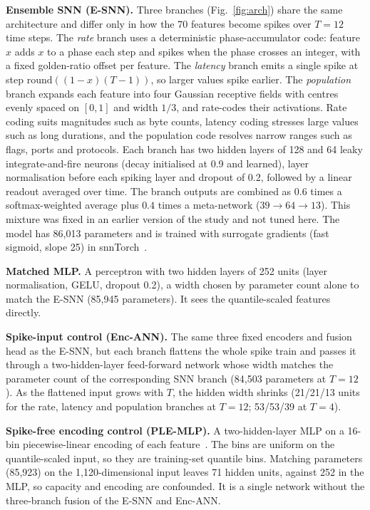 \documentclass[conference]{IEEEtran}
\begin{document}
\textbf{Ensemble SNN (E-SNN).} Three branches (Fig.~\ref{fig:arch}) share the same architecture and differ only in how the 70 features become spikes over $T = 12$ time steps. The \emph{rate} branch uses a deterministic phase-accumulator code: feature $x$ adds $x$ to a phase each step and spikes when the phase crosses an integer, with a fixed golden-ratio offset per feature. The \emph{latency} branch emits a single spike at step $\mathrm{round}((1-x)(T-1))$, so larger values spike earlier. The \emph{population} branch expands each feature into four Gaussian receptive fields with centres evenly spaced on $[0,1]$ and width $1/3$, and rate-codes their activations. Rate coding suits magnitudes such as byte counts, latency coding stresses large values such as long durations, and the population code resolves narrow ranges such as flags, ports and protocols. Each branch has two hidden layers of 128 and 64 leaky integrate-and-fire neurons (decay initialised at 0.9 and learned), layer normalisation before each spiking layer and dropout of 0.2, followed by a linear readout averaged over time. The branch outputs are combined as $0.6$ times a softmax-weighted average plus $0.4$ times a meta-network ($39 \to 64 \to 13$). This mixture was fixed in an earlier version of the study and not tuned here. The model has 86{,}013 parameters and is trained with surrogate gradients (fast sigmoid, slope 25) in snnTorch~\cite{eshraghian2023}.

\textbf{Matched MLP.} A perceptron with two hidden layers of 252 units (layer normalisation, GELU, dropout 0.2), a width chosen by parameter count alone to match the E-SNN (85{,}945 parameters). It sees the quantile-scaled features directly.

\textbf{Spike-input control (Enc-ANN).} The same three fixed encoders and fusion head as the E-SNN, but each branch flattens the whole spike train and passes it through a two-hidden-layer feed-forward network whose width matches the parameter count of the corresponding SNN branch (84{,}503 parameters at $T = 12$). As the flattened input grows with $T$, the hidden width shrinks (21/21/13 units for the rate, latency and population branches at $T = 12$; 53/53/39 at $T = 4$).

\textbf{Spike-free encoding control (PLE-MLP).} A two-hidden-layer MLP on a 16-bin piecewise-linear encoding of each feature~\cite{gorishniy2022}. The bins are uniform on the quantile-scaled input, so they are training-set quantile bins. Matching parameters (85{,}923) on the 1{,}120-dimensional input leaves 71 hidden units, against 252 in the MLP, so capacity and encoding are confounded. It is a single network without the three-branch fusion of the E-SNN and Enc-ANN.
\end{document}
